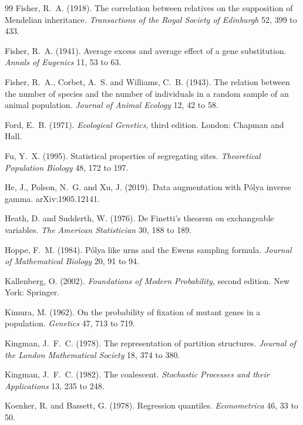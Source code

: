 \begin{thebibliography}{99}
Fisher, R.~A. (1918). The correlation between relatives on the supposition of Mendelian
inheritance. \emph{Transactions of the Royal Society of Edinburgh} 52, 399 to 433.

Fisher, R.~A. (1941). Average excess and average effect of a gene substitution. \emph{Annals of
Eugenics} 11, 53 to 63.

Fisher, R.~A., Corbet, A.~S. and Williams, C.~B. (1943). The relation between the number of
species and the number of individuals in a random sample of an animal population. \emph{Journal
of Animal Ecology} 12, 42 to 58.

Ford, E.~B. (1971). \emph{Ecological Genetics}, third edition. London: Chapman and Hall.

Fu, Y.~X. (1995). Statistical properties of segregating sites. \emph{Theoretical Population
Biology} 48, 172 to 197.

He, J., Polson, N.~G. and Xu, J. (2019). Data augmentation with P\'olya inverse gamma.
arXiv:1905.12141.

Heath, D. and Sudderth, W. (1976). De Finetti's theorem on exchangeable variables. \emph{The
American Statistician} 30, 188 to 189.

Hoppe, F.~M. (1984). P\'olya like urns and the Ewens sampling formula. \emph{Journal of
Mathematical Biology} 20, 91 to 94.

Kallenberg, O. (2002). \emph{Foundations of Modern Probability}, second edition. New York:
Springer.

Kimura, M. (1962). On the probability of fixation of mutant genes in a population.
\emph{Genetics} 47, 713 to 719.

Kingman, J.~F.~C. (1978). The representation of partition structures. \emph{Journal of the London
Mathematical Society} 18, 374 to 380.

Kingman, J.~F.~C. (1982). The coalescent. \emph{Stochastic Processes and their Applications} 13,
235 to 248.

Koenker, R. and Bassett, G. (1978). Regression quantiles. \emph{Econometrica} 46, 33 to 50.


\end{thebibliography}
